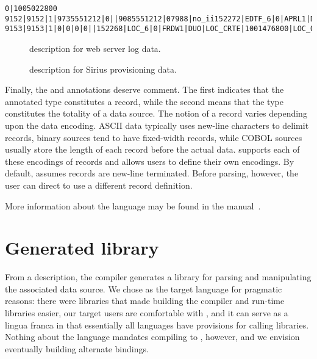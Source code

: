 \documentclass{sig-alternate}
\newcommand{\dibbler}{Sirius}
\begin{document}
\begin{figure*}
\begin{small}
\begin{center}
\begin{verbatim}
0|1005022800
9152|9152|1|9735551212|0||9085551212|07988|no_ii152272|EDTF_6|0|APRL1|DUO|10|1000295291
9153|9153|1|0|0|0|0||152268|LOC_6|0|FRDW1|DUO|LOC_CRTE|1001476800|LOC_OS_10|1001649601
\end{verbatim}
\caption{Tiny example of \dibbler{} provisioning data.}
\label{figure:dibbler-records}
\end{center}
\end{small}
\end{figure*}


\begin{figure}

\caption{\pads{} description for web server log data.}
\label{figure:wsl}
\end{figure}

\begin{figure}

\caption{\pads{} description for \dibbler{} provisioning data.}
\label{figure:dibbler}
\end{figure}


Finally, the  and  annotations deserve comment.  The first
indicates that the annotated type constitutes a record,
while the second means that the type constitutes the totality of a data source.  
The notion of a record varies depending upon the data encoding.  
ASCII data typically uses new-line characters to delimit 
records, binary sources tend to have fixed-width records, while 
COBOL sources usually store the length of each record before the actual data.
\pads{} supports each of these encodings of records and allows users to define
their own encodings.  By default, \pads{} assumes records are new-line terminated.
Before parsing, however, the user can direct \pads{} to use a different record
definition.

More information about the \pads{} language may be found in the
\pads{} manual~\cite{padsmanual}.

\section{Generated library}
From a description, the \pads{} compiler generates a \C{} library
for parsing and manipulating the associated data source.  We chose \C{}
as the target language for pragmatic reasons: there were 
libraries that made building the compiler and run-time libraries easier,
our target users are comfortable with \C{}, and it can serve 
as a lingua franca in that essentially all languages have provisions for 
calling \C{} libraries.  Nothing about the \pads{} language mandates compiling
to \C{}, however, and we envision eventually building alternate bindings.
\end{document}

